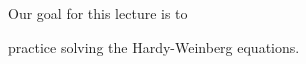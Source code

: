 \documentclass[t]{beamer}
\begin{document}
\begin{frame}{Our goal for this lecture is to}
	
	\hangpara practice solving the Hardy-Weinberg equations.
		
\end{frame}
%

%	
%		
%
%
%	
%
%
%
%		
%
%
%	
%
%
%
%
%	
%
%	
%
%	
%	
%	
%
%	
%	
%
%
%	
%	
%
%
\end{document}
